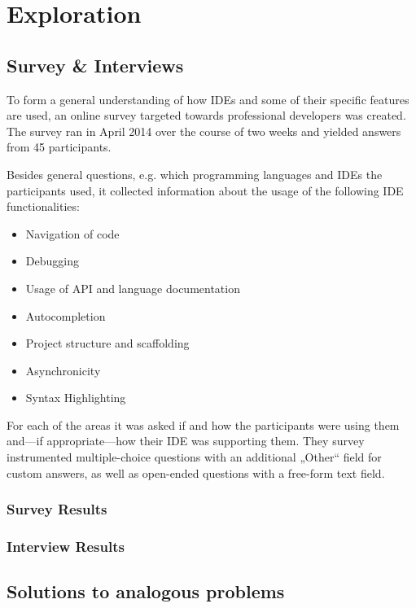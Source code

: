 \chapter{Exploration}\label{exploration}

\section{Survey \& Interviews}\label{survey-interviews}

To form a general understanding of how IDEs and some of their specific
features are used, an online survey targeted towards professional
developers was created. The survey ran in April 2014 over the course of
two weeks and yielded answers from 45 participants.

Besides general questions, e.g. which programming languages and IDEs the
participants used, it collected information about the usage of the
following IDE functionalities:

\begin{itemize}
\itemsep1pt\parskip0pt
\item
  Navigation of code
\item
  Debugging
\item
  Usage of API and language documentation
\item
  Autocompletion
\item
  Project structure and scaffolding
\item
  Asynchronicity
\item
  Syntax Highlighting
\end{itemize}

For each of the areas it was asked if and how the participants were
using them and—if appropriate—how their IDE was supporting them. They
survey instrumented multiple-choice questions with an additional „Other“
field for custom answers, as well as open-ended questions with a
free-form text field.

\subsection{Survey Results}\label{survey-results}

\subsection{Interview Results}\label{interview-results}

\section{Solutions to analogous
problems}\label{solutions-to-analogous-problems}

